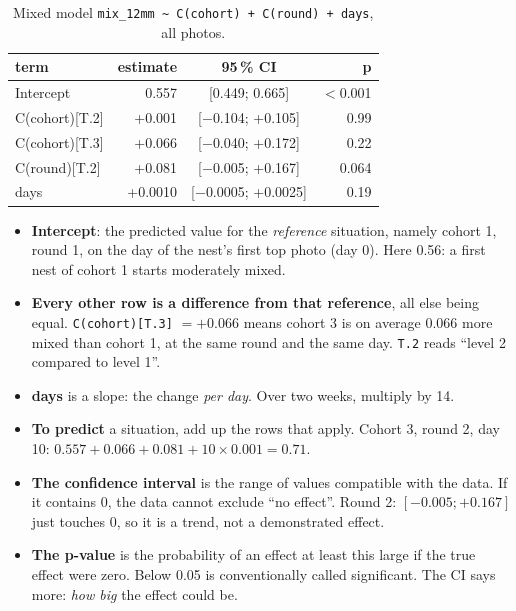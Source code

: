\documentclass[11pt,a4paper]{article}
\newcommand{\code}[1]{\texttt{#1}}
\begin{document}
\begin{table}[h]\centering\small
\begin{tabular}{lrcr}
\toprule
term & estimate & 95\,\% CI & p \\
\midrule
Intercept & 0.557 & [0.449; 0.665] & $<$0.001 \\
C(cohort)[T.2] & +0.001 & [$-$0.104; +0.105] & 0.99 \\
C(cohort)[T.3] & +0.066 & [$-$0.040; +0.172] & 0.22 \\
C(round)[T.2] & +0.081 & [$-$0.005; +0.167] & 0.064 \\
days & +0.0010 & [$-$0.0005; +0.0025] & 0.19 \\
\bottomrule
\end{tabular}
\caption{Mixed model \code{mix\_12mm \textasciitilde{} C(cohort) + C(round) + days}, all photos.}
\label{tab:coef}
\end{table}

\begin{itemize}
\item \textbf{Intercept}: the predicted value for the \emph{reference} situation, namely cohort 1, round 1,
      on the day of the nest's first top photo (day 0). Here 0.56: a first nest of cohort 1 starts moderately mixed.
\item \textbf{Every other row is a difference from that reference}, all else being equal.
      \code{C(cohort)[T.3]} $= +0.066$ means cohort 3 is on average 0.066 more mixed than cohort 1,
      at the same round and the same day. \code{T.2} reads ``level 2 compared to level 1''.
\item \textbf{days} is a slope: the change \emph{per day}. Over two weeks, multiply by 14.
\item \textbf{To predict} a situation, add up the rows that apply. Cohort 3, round 2, day 10:
      $0.557 + 0.066 + 0.081 + 10 \times 0.001 = 0.71$.
\item \textbf{The confidence interval} is the range of values compatible with the data.
      If it contains 0, the data cannot exclude ``no effect''.
      Round 2: $[-0.005; +0.167]$ just touches 0, so it is a trend, not a demonstrated effect.
\item \textbf{The p-value} is the probability of an effect at least this large if the true effect were zero.
      Below 0.05 is conventionally called significant. The CI says more: \emph{how big} the effect could be.
\end{itemize}
\end{document}
